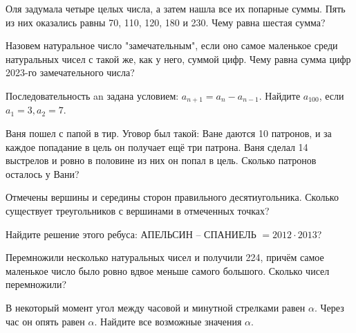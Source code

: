 Оля задумала четыре целых числа, а затем нашла все их попарные суммы. Пять из них оказались равны 70, 110, 120, 180 и 230. Чему равна шестая сумма?

Назовем натуральное число "замечательным", если оно самое маленькое среди натуральных чисел с такой же, как у него, суммой цифр. Чему равна сумма цифр 2023-го замечательного числа?

Последовательность an задана условием:  $a_{n+1} = a_n-a_{n-1}$.  Найдите $a_{100}$, если  $a_1 = 3,  a_2 = 7.$

Ваня пошел с папой в тир. Уговор был такой: Ване даются 10 патронов, и за каждое попадание в цель он получает ещё три патрона. Ваня сделал 14 выстрелов и ровно в половине из них он попал в цель. Сколько патронов осталось у Вани?

Отмечены вершины и середины сторон правильного десятиугольника. Сколько существует треугольников с вершинами в отмеченных точках?

Найдите решение этого ребуса: АПЕЛЬСИН – СПАНИЕЛЬ $= 2012\cdot2013$?

Перемножили несколько натуральных чисел и получили 224, причём самое маленькое число было ровно вдвое меньше самого большого. Сколько чисел перемножили?

В некоторый момент угол между часовой и минутной стрелками равен $\alpha$. Через час он опять равен $\alpha$. Найдите все возможные значения $\alpha$.
